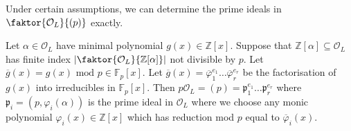 Under certain assumptions, we can determine the prime ideals in \( \faktor{\mathcal O_L}{(p)} \) exactly.
\begin{theorem}
    Let \( \alpha \in \mathcal O_L \) have minimal polynomial \( g(x) \in \mathbb Z[x] \).
    Suppose that \( \mathbb Z[\alpha] \subseteq \mathcal O_L \) has finite index \( \abs{\faktor{\mathcal O_L}{\mathbb Z[\alpha]}} \) not divisible by \( p \).
    Let \( \overline g(x) = g(x) \text{ mod } p \in \mathbb F_p[x] \).
    Let \( \overline g(x) = \overline \varphi_1^{e_1} \dots \overline \varphi_r^{e_r} \) be the factorisation of \( g(x) \) into irreducibles in \( \mathbb F_p[x] \).
    Then \( p\mathcal O_L = (p) = \mathfrak p_1^{e_1} \dots \mathfrak p_r^{e_r} \) where \( \mathfrak p_i = (p, \varphi_i(\alpha)) \) is the prime ideal in \( \mathcal O_L \) where we choose any monic polynomial \( \varphi_i(x) \in \mathbb Z[x] \) which has reduction mod \( p \) equal to \( \overline \varphi_i(x) \).
\end{theorem}
